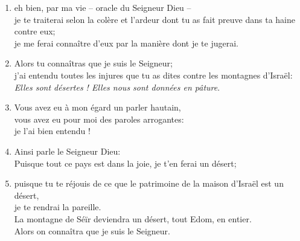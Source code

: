 \documentclass[12pt,a4paper,titlepage]{article}
\def \pslabelsep{0.2em} %
\def \psleftmargin{0em} %
\begin{document}
\begin{enumerate}[leftmargin=\psleftmargin, labelsep = \pslabelsep, label={\arabic*}, font=\color{\pscolor}\small\textsuperscript, parsep=0em, itemsep=0em, topsep=0em ]
\item eh bien, par ma vie – oracle du Seigneur Dieu – \\
je te traiterai selon la colère et l’ardeur dont tu as fait preuve dans ta haine contre eux; \\ je me ferai connaître d’eux par la manière dont je te jugerai.
\item Alors tu connaîtras que je suis le Seigneur; \\ j’ai entendu toutes les injures que tu as dites contre les montagnes d’Israël: \\ \og{}\emph{Elles sont désertes ! Elles nous sont données en pâture}.\fg{}
\item Vous avez eu à mon égard un parler hautain, \\ vous avez eu pour moi des paroles arrogantes: \\ je l’ai bien entendu ! \parSpace
\item Ainsi parle le Seigneur Dieu: \\ Puisque tout ce pays est dans la joie, je t’en ferai un désert;
\item puisque tu te réjouis de ce que le patrimoine de la maison d’Israël est un désert, \\ je te rendrai la pareille. \\ La montagne de Séïr deviendra un désert, tout Edom, en entier. \\ Alors on connaîtra que je suis le Seigneur.
\end{enumerate}
\newpage
\end{document}
